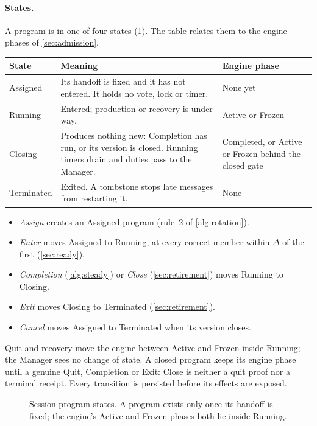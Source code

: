 \documentclass[11pt,a4paper]{article}
\begin{document}
\paragraph{States.}
A program is in one of four states (\cref{fig:program-states}). The
table relates them to the engine phases of \cref{sec:admission}.
\begin{center}\small
\begin{tabularx}{\linewidth}{@{}>{\raggedright\arraybackslash}p{.15\linewidth}Y>{\raggedright\arraybackslash}p{.25\linewidth}@{}}\toprule
State & Meaning & Engine phase\\\midrule
Assigned & Its handoff is fixed and it has not entered. It holds no vote,
lock or timer. & None yet\\
Running & Entered; production or recovery is under way. & Active or
Frozen\\
Closing & Produces nothing new: Completion has run, or its version is
closed. Running timers drain and duties pass to the Manager. &
Completed, or Active or Frozen behind the closed gate\\
Terminated & Exited. A tombstone stops late messages from restarting
it. & None\\\bottomrule
\end{tabularx}
\end{center}
\begin{itemize}
\item \emph{Assign} creates an Assigned program (rule~2 of \cref{alg:rotation}).
\item \emph{Enter} moves Assigned to Running, at every correct member
within $\Delta$ of the first (\cref{sec:ready}).
\item \emph{Completion} (\cref{alg:steady}) or \emph{Close}
(\cref{sec:retirement}) moves Running to Closing.
\item \emph{Exit} moves Closing to Terminated (\cref{sec:retirement}).
\item \emph{Cancel} moves Assigned to Terminated when its version closes.
\end{itemize}
Quit and recovery move the engine between Active and Frozen inside
Running; the Manager sees no change of state. A closed program keeps its
engine phase until a genuine Quit, Completion or Exit: Close is neither
a quit proof nor a terminal receipt. Every transition is persisted
before its effects are exposed.

\begin{figure}[htbp]\centering

\caption{Session program states. A program exists only once its handoff
is fixed; the engine's Active and Frozen phases both lie inside
Running.}
\label{fig:program-states}
\end{figure}
\end{document}
